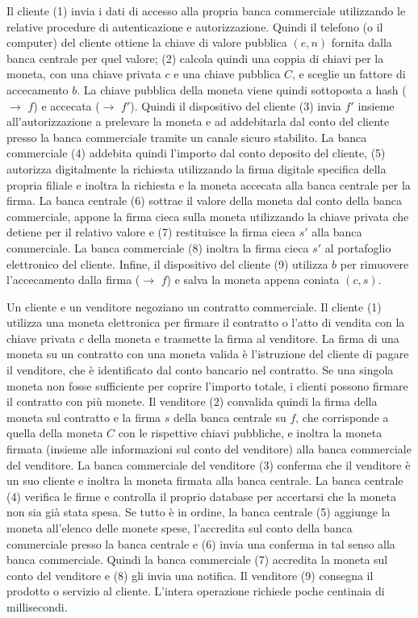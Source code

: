 \documentclass{article}
\begin{document}
Il cliente (1) invia i dati di accesso alla propria banca commerciale
utilizzando le relative procedure di autenticazione e autorizzazione.
Quindi il telefono (o il computer) del cliente ottiene la chiave di
valore pubblica $(e, n)$ fornita dalla banca centrale per quel valore; (2)
calcola quindi una coppia di chiavi per la moneta, con una chiave
privata $c$ e una chiave pubblica $C$, e sceglie un fattore di accecamento
$b$. La chiave pubblica della moneta viene quindi sottoposta a hash
($\to$ $f$) e accecata ($\to$ $f'$). Quindi il dispositivo del cliente (3)
invia $f'$ insieme all'autorizzazione a prelevare la moneta e ad
addebitarla dal conto del cliente presso la banca commerciale tramite un
canale sicuro stabilito. La banca commerciale (4) addebita quindi
l'importo dal conto deposito del cliente, (5) autorizza digitalmente la
richiesta utilizzando la firma digitale specifica della propria filiale
e inoltra la richiesta e la moneta accecata alla banca centrale per la
firma. La banca centrale (6) sottrae il valore della moneta dal conto
della banca commerciale, appone la firma cieca sulla moneta
utilizzando la chiave privata che detiene per il relativo valore e (7)
restituisce la firma cieca $s'$ alla banca commerciale. La banca
commerciale (8) inoltra la firma cieca $s'$ al portafoglio elettronico
del cliente. Infine, il dispositivo del cliente (9) utilizza $b$ per
rimuovere l'accecamento dalla firma ($\to$ $f$) e salva la moneta appena
coniata $(c, s)$.

Un cliente e un venditore negoziano un contratto commerciale. Il
cliente (1) utilizza una moneta elettronica per firmare il contratto o
l'atto di vendita con la chiave privata $c$ della moneta e trasmette la
firma al venditore. La firma di una moneta su un contratto con una
moneta valida è l'istruzione del cliente di pagare il venditore, che è
identificato dal conto bancario nel contratto. Se una singola moneta
non fosse sufficiente per coprire l'importo totale, i clienti possono
firmare il contratto con più monete. Il venditore (2) convalida quindi
la firma della moneta sul contratto e la firma $s$ della banca centrale
su $f$, che  corrisponde a quella della moneta $C$ con le rispettive
chiavi pubbliche, e inoltra la moneta firmata (insieme alle
informazioni sul conto del venditore) alla banca commerciale del
venditore. La banca commerciale del venditore (3) conferma che il
venditore è un suo cliente e inoltra la moneta firmata alla banca
centrale. La banca centrale (4) verifica le firme e controlla il
proprio database per accertarsi che la moneta non sia già stata spesa.
Se tutto è in ordine, la banca centrale (5) aggiunge la moneta
all'elenco delle monete spese, l'accredita sul conto della banca
commerciale presso la banca centrale e (6) invia una conferma in tal
senso alla banca commerciale. Quindi la banca commerciale (7)
accredita la moneta sul conto del venditore e (8) gli invia una
notifica. Il venditore (9) consegna il prodotto o servizio al cliente.
L'intera operazione richiede poche centinaia di millisecondi.
\end{document}
